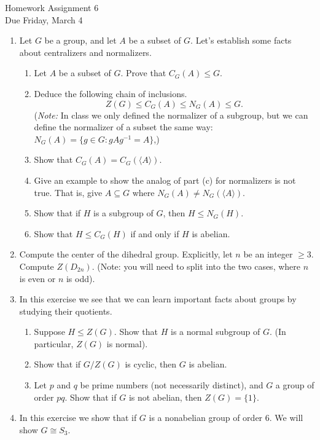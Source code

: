 \documentclass[11pt]{article}
\newcommand{\la}{\langle}
\newcommand{\ra}{\rangle}
\begin{document}
\begin{center}
\Large {Homework Assignment 6}\\
\small {Due Friday, March 4}
\end{center}
\begin{enumerate}
  \item Let $G$ be a group, and let $A$ be a subset of $G$.  Let's establish some facts about centralizers and normalizers.
  \begin{enumerate}
    \item Let $A$ be a subset of $G$.  Prove that $C_G(A)\le G$.
    \item Deduce the following chain of inclusions.
    \[Z(G)\le C_G(A)\le N_G(A)\le G.\]
    (\textit{Note: }In class we only defined the normalizer of a subgroup, but we can define the normalizer of a subset the same way: $N_G(A) = \{g\in G:gAg^{-1} = A\}$,)
    \item Show that $C_G(A) = C_G(\la A\ra)$.
    \item Give an example to show the analog of part (c) for normalizers is not true.  That is, give $A\subseteq G$ where $N_G(A)\not=N_G(\la A\ra)$.
    \item Show that if $H$ is a subgroup of $G$, then $H\le N_G(H)$.
    \item Show that $H\le C_G(H)$ if and only if $H$ is abelian.
  \end{enumerate}
    \item Compute the center of the dihedral group.  Explicitly, let $n$ be an integer $\ge3$.  Compute $Z(D_{2n})$.  (Note: you will need to split into the two cases, where $n$ is even or $n$ is odd).
    \item In this exercise we see that we can learn important facts about groups by studying their quotients.
      \begin{enumerate}
    \item Suppose $H\le Z(G)$.  Show that $H$ is a normal subgroup of $G$.  (In particular, $Z(G)$ is normal).
    \item Show that if $G/Z(G)$ is cyclic, then $G$ is abelian.
    \item Let $p$ and $q$ be prime numbers (not necessarily distinct), and $G$ a group of order $pq$.  Show that if $G$ is not abelian, then $Z(G) = \{1\}$.
  \end{enumerate}
  \item In this exercise we show that if $G$ is a nonabelian group of order $6$.  We will show $G\cong S_3$.
  \begin{enumerate}

\end{enumerate}
\end{enumerate}
\end{document}
